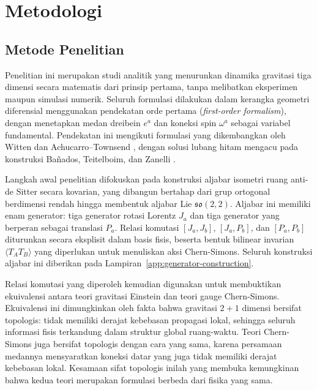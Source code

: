 \chapter{Metodologi}

\section{Metode Penelitian}

Penelitian ini merupakan studi analitik yang menurunkan dinamika gravitasi tiga dimensi secara matematis dari prinsip pertama, tanpa melibatkan eksperimen maupun simulasi numerik. Seluruh formulasi dilakukan dalam kerangka geometri diferensial menggunakan pendekatan orde pertama (\textit{first-order formalism}), dengan menetapkan medan dreibein $e^a$ dan koneksi spin $\omega^a$ sebagai variabel fundamental. Pendekatan ini mengikuti formulasi yang dikembangkan oleh Witten \cite{witten1988} dan Achucarro--Townsend \cite{achucarro1986}, dengan solusi lubang hitam mengacu pada konstruksi Ba\~{n}ados, Teitelboim, dan Zanelli \cite{banados1992, banados1993}.

Langkah awal penelitian difokuskan pada konstruksi aljabar isometri ruang anti-de Sitter secara kovarian, yang dibangun bertahap dari grup ortogonal berdimensi rendah hingga membentuk aljabar Lie $\mathfrak{so}(2,2)$. Aljabar ini memiliki enam generator: tiga generator rotasi Lorentz $J_a$ dan tiga generator yang berperan sebagai translasi $P_a$. Relasi komutasi $[J_a, J_b]$, $[J_a, P_b]$, dan $[P_a, P_b]$ diturunkan secara eksplisit dalam basis fisis, beserta bentuk bilinear invarian $\langle T_A T_B \rangle$ yang diperlukan untuk menuliskan aksi Chern-Simons. Seluruh konstruksi aljabar ini diberikan pada Lampiran~\ref{app:generator-construction}.

Relasi komutasi yang diperoleh kemudian digunakan untuk membuktikan ekuivalensi antara teori gravitasi Einstein dan teori gauge Chern-Simons. Ekuivalensi ini dimungkinkan oleh fakta bahwa gravitasi $2+1$ dimensi bersifat topologis: tidak memiliki derajat kebebasan propagasi lokal, sehingga seluruh informasi fisis terkandung dalam struktur global ruang-waktu. Teori Chern-Simons juga bersifat topologis dengan cara yang sama, karena persamaan medannya mensyaratkan koneksi datar yang juga tidak memiliki derajat kebebasan lokal. Kesamaan sifat topologis inilah yang membuka kemungkinan bahwa kedua teori merupakan formulasi berbeda dari fisika yang sama.

